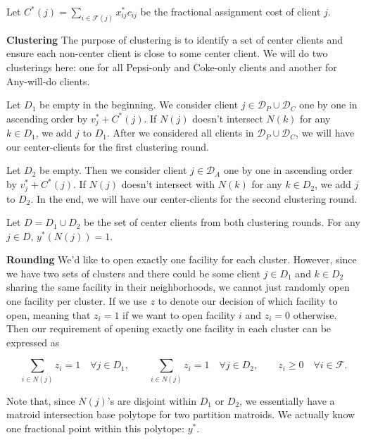 \noindent
Let $C^*(j) = \sum_{i \in \mathcal{F}(j)} x^*_{ij}c_{ij}$
be the fractional assignment cost of client $j$.

\textbf{Clustering} The purpose of clustering is to identify a set of center clients and ensure each non-center client is close to some center client. We will do two clusterings here: one for all Pepsi-only and Coke-only clients and another
for Any-will-do clients.

Let $D_1$ be empty in the beginning. We consider client $j \in \mathcal{D}_P \cup \mathcal{D}_C$
one by one in ascending order by $v^*_j + C^*(j)$. If $N(j)$ doesn't intersect $N(k)$
for any $k \in D_1$, we add $j$ to $D_1$. After we considered all clients in $\mathcal{D}_P \cup \mathcal{D}_C$,
we will have our center-clients for the first clustering round.

Let $D_2$ be empty. Then we consider client $j \in \mathcal{D}_A$ one by one
in ascending order by $v^*_j + C^*(j)$.
If $N(j)$ doesn't intersect with $N(k)$ for any $k \in D_2$, we add $j$ to $D_2$.
In the end, we will have our center-clients for the second clustering round.

\begin{fact}
Let $D = D_1 \cup D_2$ be the set of center clients from both clustering rounds.
For any $j \in D$, $y^*(N(j)) = 1$.
\end{fact}

\textbf{Rounding} We'd like to open exactly one facility for each cluster. However, since we have two sets of clusters and there could be some client $j \in D_1$ and $k \in D_2$ sharing the same facility in their neighborhoods, we cannot just randomly open one facility per cluster. If we use $z$ to denote our decision of which facility to open, meaning that $z_i = 1$ if we want to open facility $i$ and $z_i = 0$ otherwise. Then our requirement of opening exactly one facility in each cluster can be expressed as

\[
\sum_{i \in N(j)} z_i = 1 \quad \forall j \in D_1, \qquad %
\sum_{i \in N(j)} z_i = 1 \quad \forall j \in D_2, \qquad %
z_i \ge 0 \quad \forall i \in \mathcal{F}.
\]

Note that, since $N(j)$'s are disjoint within $D_1$ or $D_2$, we essentially have
a matroid intersection base polytope for two partition matroids.
We actually know one fractional point within this polytope: $y^*$.

